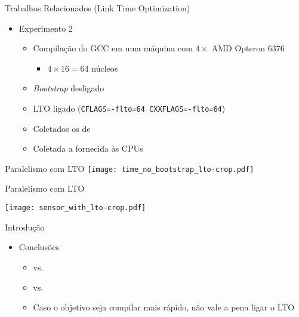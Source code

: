 \begin{frame}{Trabalhos Relacionados (Link Time Optimization)}
    \begin{itemize}
        \item Experimento 2
        \begin{itemize}
            \item Compilação do GCC em uma máquina com $4\times$ AMD Opteron 6376
                \begin{itemize}
                    \item $4 \times 16 = 64$ núcleos
                \end{itemize}
            \item \textit{Bootstrap} desligado
            \item LTO ligado (\texttt{CFLAGS=-flto=64 CXXFLAGS=-flto=64})
            \item Coletados os {\color{blue}{tempos de compilação}} de {\color{red}{cada arquivo}}
            \item Coletada a {\color{blue}{soma da potência instantânea}} fornecida às CPUs
        \end{itemize}
    \end{itemize}
\end{frame}

\begin{frame}
    Paralelismo com LTO
    \texttt{[image: time\_no\_bootstrap\_lto-crop.pdf]}
    \label{fig:analysis_lto}
\end{frame}

\begin{frame}
    Paralelismo com LTO

    \centering
    \texttt{[image: sensor\_with\_lto-crop.pdf]}
    \label{fig:analysis_lto}
\end{frame}

\begin{frame}{Introdução}
    \begin{itemize}
        \item Conclusões
        \begin{itemize}
            \item {\color{blue}{180s sem LTO}} vs. {\color{red}{300s com LTO}}
            \item {\color{blue}{1.8Wh sem LTO}} vs. {\color{red}{2.7Wh com LTO}}
            \item Caso o objetivo seja compilar mais rápido, não vale a pena ligar o LTO
        \end{itemize}
    \end{itemize}
\end{frame}

